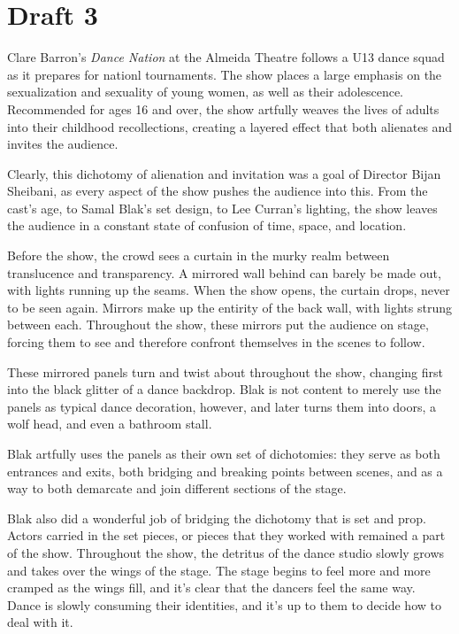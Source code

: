 \documentclass[12pt]{article}[titlepage]
\newcommand{\1}{\={a}}
\newcommand{\2}{\={e}}
\newcommand{\3}{\={\i}}
\newcommand{\4}{\=o}
\newcommand{\5}{\=u}
\newcommand{\6}{\={A}}
\renewcommand{\,}{\textsuperscript{,}}
\begin{document}
\section{Draft 3}
Clare Barron's \textit{Dance Nation} at the Almeida Theatre follows a U13 dance squad as it prepares for nationl tournaments.
The show places a large emphasis on the sexualization and sexuality of young women, as well as their adolescence.
Recommended for ages 16 and over, the show artfully weaves the lives of adults into their childhood recollections, creating a layered effect that both alienates and invites the audience.

Clearly, this dichotomy of alienation and invitation was a goal of Director Bijan Sheibani, as every aspect of the show pushes the audience into this.
From the cast's age, to Samal Blak's set design, to Lee Curran's lighting, the show leaves the audience in a constant state of confusion of time, space, and location.

Before the show, the crowd sees a curtain in the murky realm between translucence and transparency.
A mirrored wall behind can barely be made out, with lights running up the seams.
When the show opens, the curtain drops, never to be seen again.
Mirrors make up the entirity of the back wall, with lights strung between each.
Throughout the show, these mirrors put the audience on stage, forcing them to see and therefore confront themselves in the scenes to follow.

These mirrored panels turn and twist about throughout the show, changing first into the black glitter of a dance backdrop.
Blak is not content to merely use the panels as typical dance decoration, however, and later turns them into doors, a wolf head, and even a bathroom stall.

Blak artfully uses the panels as their own set of dichotomies: they serve as both entrances and exits, both bridging and breaking points between scenes, and as a way to both demarcate and join different sections of the stage.

Blak also did a wonderful job of bridging the dichotomy that is set and prop.
Actors carried in the set pieces, or pieces that they worked with remained a part of the show.
Throughout the show, the detritus of the dance studio slowly grows and takes over the wings of the stage.
The stage begins to feel more and more cramped as the wings fill, and it's clear that the dancers feel the same way.
Dance is slowly consuming their identities, and it's up to them to decide how to deal with it.
\end{document}

